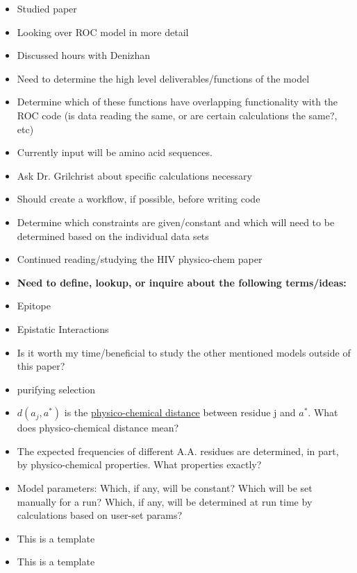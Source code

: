 \documentclass[12pt,hyperref]{labbook}
\begin{document}
\begin{itemize}
  \item Studied paper
  \item Looking over ROC model in more detail
  \item Discussed hours with Denizhan 
\end{itemize}
\begin{itemize}
  \item Need to determine the high level deliverables/functions of the model
  \item Determine which of these functions have overlapping functionality with
the ROC code (is data reading the same, or are certain calculations the same?, etc)
  \item Currently input will be amino acid sequences. 
  \item Ask Dr. Grilchrist about specific calculations necessary
  \item Should create a workflow, if possible, before writing code
  \item Determine which constraints are given/constant and which will need to
be determined based on the individual data sets
\end{itemize}


\begin{itemize}
  \item Continued reading/studying the HIV physico-chem paper 
\end{itemize}
\begin{itemize}
  \item \textbf{Need to define, lookup, or inquire about the following terms/ideas:}
  \item Epitope
  \item Epistatic Interactions
  \item Is it worth my time/beneficial to study the other mentioned models
outside of this paper?
  \item purifying selection
  \item $d(a_{j}, a^{*})$ is the \underline{physico-chemical distance} between
residue j and $a^{*}$. What does physico-chemical distance mean?
  \item The expected frequencies of different A.A. residues are determined, in
part, by physico-chemical properties. What properties exactly? 
  \item Model parameters: Which, if any, will be constant? Which will be
set manually for a run? Which, if any, will be determined at run time by
calculations based on user-set params?  
\end{itemize}

\begin{itemize}
  \item This is a template
\end{itemize}
\begin{itemize}
  \item This is a template
\end{itemize}


 
\end{document}
